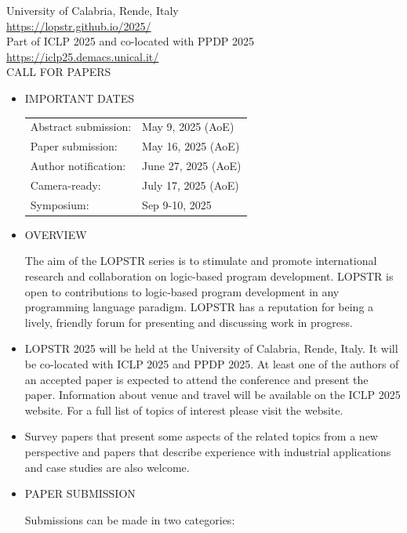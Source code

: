 \documentclass[prodmode,acmtecs]{acmsmall} %
\begin{document}
  University of Calabria, Rende, Italy\\ 
  \href{https://lopstr.github.io/2025/}{https://lopstr.github.io/2025/}\\ 
  Part of ICLP 2025 and co-located with PPDP 2025 \href{https://iclp25.demacs.unical.it/}{https://iclp25.demacs.unical.it/}\\ 
CALL FOR PAPERS 

\begin{itemize}\item  IMPORTANT DATES 
 
\begin{tabulary}{\linewidth}{LL}Abstract submission:  & May 9, 2025 (AoE) \\
Paper submission:  & May 16, 2025 (AoE) \\
Author notification:  & June 27, 2025 (AoE) \\
Camera-ready:  & July 17, 2025 (AoE) \\
Symposium:  & Sep 9-10, 2025 \\
\end{tabulary}
 
\item   OVERVIEW 
 
  The aim of the LOPSTR series is to stimulate and promote international research and collaboration on logic-based program development. LOPSTR is open to contributions to logic-based program development in any programming language paradigm. LOPSTR has a reputation for being a lively, friendly forum for presenting and discussing work in progress.  
 
\item  LOPSTR 2025 will be held at the University of Calabria, Rende, Italy. It will be co-located with ICLP 2025 and PPDP 2025. At least one of the authors of an accepted paper is expected to attend the conference and present the paper. Information about venue and travel will be available on the ICLP 2025 website. For a full list of topics of interest please visit the website.  
 
\item  Survey papers that present some aspects of the related topics from a new perspective and papers that describe experience with industrial applications and case studies are also welcome.  
 
\item  PAPER SUBMISSION 
 
  Submissions can be made in two categories: 
 

\end{itemize}
\end{document}
